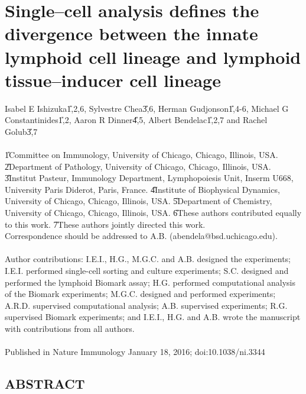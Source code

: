 


\chapter[Single--cell analysis defines the divergence between the \\ innate lymphoid cell lineage and lymphoid tissue--inducer cell lineage]{Single--cell analysis defines the divergence between the innate lymphoid cell lineage and lymphoid tissue--inducer cell lineage}

Isabel E Ishizuka\U{1,2,6}, Sylvestre Chea\U{3,6}, Herman Gudjonson\U{1,4-6}, Michael G Constantinides\U{1,2}, Aaron R Dinner\U{4,5}, Albert Bendelac\U{1,2,7} and Rachel Golub\U{3,7}
\\ \\
\U{1}Committee on Immunology, University of Chicago, Chicago, Illinois, USA. 
\U{2}Department of Pathology, University of Chicago, Chicago, Illinois, USA. 
\U{3}Institut Pasteur, Immunology Department, Lymphopoiesis Unit, Inserm U668, University Paris Diderot, Paris, France. 
\U{4}Institute of Biophysical Dynamics, University of Chicago, Chicago, Illinois, USA. 
\U{5}Department of Chemistry, University of Chicago, Chicago, Illinois, USA. 
\U{6}These authors contributed equally to this work. 
\U{7}These authors jointly directed this work. 
\\
Correspondence should be addressed to A.B. (abendela@bsd.uchicago.edu).
\\ \\
Author contributions: I.E.I., H.G., M.G.C. and A.B. designed the experiments; I.E.I. performed single-cell sorting and culture experiments; S.C. designed and performed the lymphoid Biomark assay; H.G. performed computational analysis of the Biomark experiments; M.G.C. designed and performed experiments; A.R.D. supervised computational analysis; A.B. supervised experiments; R.G. supervised Biomark experiments; and I.E.I., H.G. and A.B. wrote the manuscript with contributions from all authors.
\\ \\
Published in Nature Immunology January 18, 2016; doi:10.1038/ni.3344

\newpage
\section{ABSTRACT}

